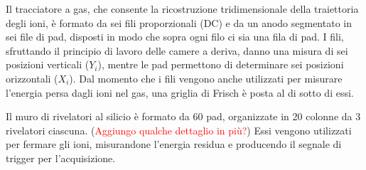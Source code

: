 Il tracciatore a gas, che consente la ricostruzione tridimensionale della traiettoria degli ioni, è formato da sei fili proporzionali (DC) e da un anodo segmentato in sei file di pad, disposti in modo che sopra ogni filo ci sia una fila di pad.
I fili, sfruttando il principio di lavoro delle camere a deriva, danno una misura di sei posizioni verticali ($Y_i$), mentre le pad permettono di determinare sei posizioni orizzontali ($X_i$).
Dal momento che i fili vengono anche utilizzati per misurare l'energia persa dagli ioni nel gas, una griglia di Frisch è posta al di sotto di essi.




Il muro di rivelatori al silicio è formato da 60 pad, organizzate in 20 colonne da 3 rivelatori ciascuna. (\textcolor{red}{Aggiungo qualche dettaglio in più?})
Essi vengono utilizzati per fermare gli ioni, misurandone l'energia residua e producendo il segnale di trigger per l'acquisizione. 

